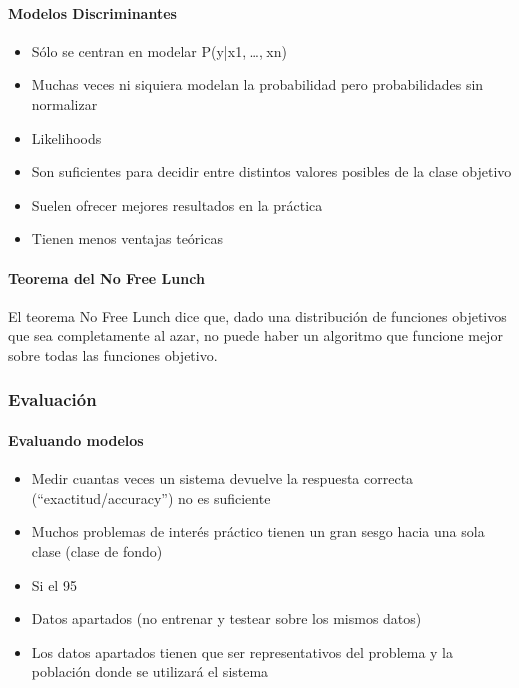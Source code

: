 \documentclass[a4paper,10pt]{article}
\begin{document}
	\paragraph{Modelos Discriminantes}
	  \begin{itemize}
	    \item Sólo se centran en modelar P(y|x1, …, xn)
	    \item Muchas veces ni siquiera modelan la probabilidad pero probabilidades sin normalizar
	    \item Likelihoods
	    \item Son suficientes para decidir entre distintos valores posibles de la clase objetivo
	    \item Suelen ofrecer mejores resultados en la práctica
	    \item Tienen menos ventajas teóricas
	  \end{itemize}

	\paragraph{Teorema del No Free Lunch}
	  El teorema No Free Lunch dice que, dado una distribución de funciones objetivos que sea completamente al azar, no puede haber un algoritmo que funcione mejor sobre todas las funciones objetivo.

      \subsubsection{Evaluación}

	\paragraph {Evaluando modelos}
	  \begin{itemize}
	    \item Medir cuantas veces un sistema devuelve la respuesta correcta (“exactitud/accuracy”) no es suficiente
	    \item Muchos problemas de interés práctico tienen un gran sesgo hacia una sola clase (clase de fondo)
	    \item Si el 95%
	    \item Datos apartados (no entrenar y testear sobre los mismos datos)
	    \item Los datos apartados tienen que ser representativos del problema y la población donde se utilizará el sistema
	  \end{itemize}
\end{document}
